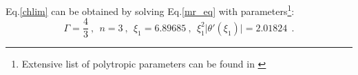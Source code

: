 \documentclass[oneside,a4paper,11pt]{report}
\begin{document}
Eq.\eqref{chlim} can be obtained by solving Eq.\eqref{mr_eq} with parameters\footnote{Extensive list of polytropic parameters can be found in
\citet{1939MNRAS..99..673C}}:
\begin{equation}
\Gamma = \frac{4}{3}\:,\:\: n =3 \:,\:\: \xi_1 = 6.89685 \:,\:\: \xi_1^2 \lvert \theta' (\xi_1) \lvert = 2.01824\:\:. 
\end{equation}
                                                                                                                                                                                                                                                                                                                                                                                                                                                                                                                                                                                                                                                                                                                                                                                                                                                                                                                                                                                                                                                                                                                                                                                                                                                                                                                                                                                                                                                                                                                                                                                                                                                                                                                                                                                                                                                                                                                                                                                                                                                                                                                                                                                                                                                                                                                                                                                                                                                                                                                                                                                                                                                                                                                                                                                                                                                                                                                                                                                                     
\end{document}
